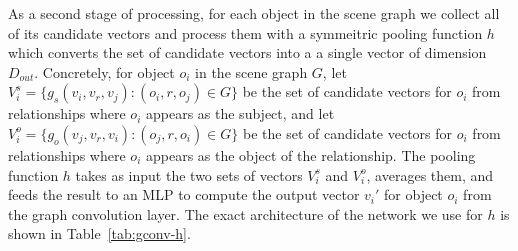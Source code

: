 \documentclass[10pt,twocolumn,letterpaper]{article}
\begin{document}
\begin{table}
  \centering
  \setlength{\tabcolsep}{1mm}
  \vspace{1mm}
  \caption{
    Network architecture for the first network $g$ used in graph convolution;
    this single network implements the three functions $g_s$, $g_p$, and $g_o$
    from the main text.
  }
  \label{tab:gconv-g}
\end{table}

As a second stage of processing, for each object in the scene graph we collect all of its candidate vectors and process them with a symmeitric pooling function $h$ which converts the set of candidate vectors into a a single vector of dimension $D_{out}$. Concretely, for object $o_i$ in the scene graph $G$, let $V_i^s=\{g_s(v_i,v_r,v_j):(o_i,r,o_j)\in G\}$ be the set of candidate vectors for $o_i$ from relationships where $o_i$ appears as the subject, and let $V_i^o=\{g_o(v_j, v_r, v_i):(o_j, r, o_i)\in G\}$ be the set of candidate vectors for $o_i$ from relationships where $o_i$ appears as the object of the relationship. The pooling function $h$ takes as input the two sets of vectors $V_i^s$ and $V_i^o$, averages them, and feeds the result to an MLP to compute the output vector $v_i'$ for object $o_i$ from the graph convolution layer. The exact architecture of the network we use for $h$ is shown in Table~\ref{tab:gconv-h}.
\end{document}
